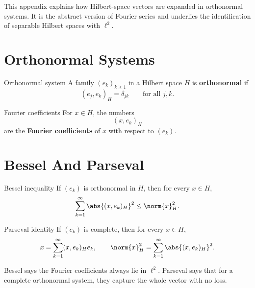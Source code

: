 \documentclass[header={Appendix F Exam Study Notes}]{study-note}
\begin{document}

\vspace{0.8em}

\begin{focusbox}
This appendix explains how Hilbert-space vectors are expanded in orthonormal systems. It is the abstract version of Fourier series and underlies the identification of separable Hilbert spaces with $\ell^2$.
\end{focusbox}

\tableofcontents

\section{Orthonormal Systems}

\begin{defbox}{Orthonormal system}
A family $(e_k)_{k\ge 1}$ in a Hilbert space $H$ is \textbf{orthonormal} if
\[
(e_j,e_k)_H=\delta_{jk}
\qquad \text{for all } j,k.
\]
\end{defbox}

\begin{defbox}{Fourier coefficients}
For $x\in H$, the numbers
\[
(x,e_k)_H
\]
are the \textbf{Fourier coefficients} of $x$ with respect to $(e_k)$.
\end{defbox}

\section{Bessel And Parseval}

\begin{thmbox}{Bessel inequality}
If $(e_k)$ is orthonormal in $H$, then for every $x\in H$,
\[
\sum_{k=1}^{\infty}\abs{(x,e_k)_H}^2\le \norm{x}_H^2.
\]
\end{thmbox}

\begin{thmbox}{Parseval identity}
If $(e_k)$ is complete, then for every $x\in H$,
\[
x=\sum_{k=1}^{\infty}(x,e_k)_He_k,
\qquad
\norm{x}_H^2=\sum_{k=1}^{\infty}\abs{(x,e_k)_H}^2.
\]
\end{thmbox}

\begin{focusbox}
Bessel says the Fourier coefficients always lie in $\ell^2$. Parseval says that for a complete orthonormal system, they capture the whole vector with no loss.
\end{focusbox}
\end{document}
